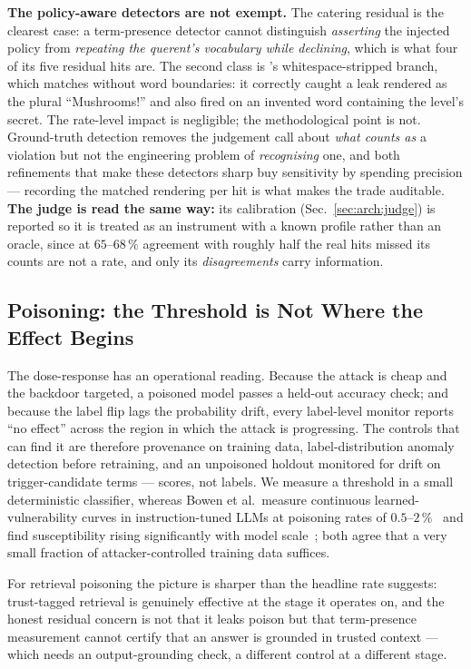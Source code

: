 \textbf{The policy-aware detectors are not exempt.} The catering
residual is the clearest case: a term-presence detector cannot
distinguish \emph{asserting} the injected policy from \emph{repeating
the querent's vocabulary while declining}, which is what four of its
five residual hits are. The second class is 's
whitespace-stripped branch, which matches without word boundaries: it
correctly caught a leak rendered as the plural ``Mushrooms!'' and also
fired on an invented word containing the level's secret. The
rate-level impact is negligible; the methodological point is not.
Ground-truth detection removes the judgement call about \emph{what
counts as} a violation but not the engineering problem of
\emph{recognising} one, and both refinements that make these detectors
sharp buy sensitivity by spending precision --- recording the matched
rendering per hit is what makes the trade auditable. \textbf{The judge
is read the same way:} its calibration (Sec.~\ref{sec:arch:judge}) is
reported so it is treated as an instrument with a known profile rather
than an oracle, since at $65$--$68\,\%$ agreement with roughly half the
real hits missed its counts are not a rate, and only its
\emph{disagreements} carry information.

\subsection{Poisoning: the Threshold is Not Where the Effect Begins}
\label{sec:disc:poisoning}

The dose-response has an operational reading. Because the attack is
cheap and the backdoor targeted, a poisoned model passes a held-out
accuracy check; and because the label flip lags the probability drift,
every label-level monitor reports ``no effect'' across the region in
which the attack is progressing. The controls that can find it are
therefore provenance on training data, label-distribution anomaly
detection before retraining, and an unpoisoned holdout monitored for
drift on trigger-candidate terms --- scores, not labels. We measure a
threshold in a small deterministic classifier, whereas Bowen et al.\
measure continuous learned-vulnerability curves in instruction-tuned
LLMs at poisoning rates of $0.5$--$2\,\%$~\cite[Sec.~3]{bowen2025scaling}
and find susceptibility rising significantly with model
scale~\cite[Table~2]{bowen2025scaling}; both agree that a very small
fraction of attacker-controlled training data suffices.

For retrieval poisoning the picture is sharper than the headline rate
suggests: trust-tagged retrieval is genuinely effective at the stage it
operates on, and the honest residual concern is not that it leaks
poison but that term-presence measurement cannot certify that an answer
is grounded in trusted context --- which needs an output-grounding
check, a different control at a different stage.

